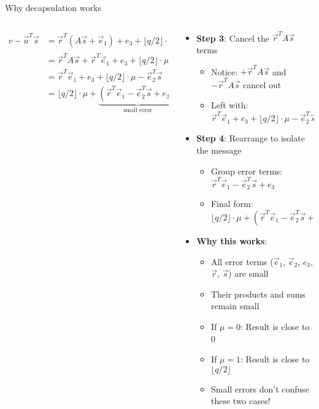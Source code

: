 \documentclass[aspectratio=169, lualatex, handout]{beamer}
\begin{document}
\begin{frame}{Why decapsulation works}
	\begin{columns}[c]
		\begin{column}{0.3\textwidth}
			\tiny
			\begin{align*}
				v - \vec{u}^T\vec{s} & = \vec{r}^{T}(A\vec{s} + \vec{e}_1) + e_3 + \lfloor q/2 \rfloor \cdot \mu - (\vec{r}^{T}A + \vec{e}_{2}^{T})\vec{s}               \\
				                     & = \vec{r}^{T}A\vec{s} + \vec{r}^{T}\vec{e}_1 + e_3 + \lfloor q/2 \rfloor \cdot \mu - \vec{r}^{T}A\vec{s} - \vec{e}_{2}^{T}\vec{s} \\
				                     & = \vec{r}^{T}\vec{e}_{1} + e_3 + \lfloor q/2 \rfloor \cdot \mu - \vec{e}_{2}^{T}\vec{s}                                           \\
				                     & = \lfloor q/2 \rfloor \cdot \mu + \underbrace{(\vec{r}^{T}\vec{e}_{1} - \vec{e}_{2}^{T}\vec{s} + e_3)}_{\text{small error}}
			\end{align*}
		\end{column}
		\begin{column}{0.7\textwidth}
			\begin{itemize}
				\item \textbf{Step 3}: Cancel the $\vec{r}^TA\vec{s}$ terms
				      \begin{itemize}
					      \item Notice: $+\vec{r}^TA\vec{s}$ and $-\vec{r}^TA\vec{s}$ cancel out
					      \item Left with: $\vec{r}^T\vec{e}_1 + e_3 + \lfloor q/2 \rfloor \cdot \mu - \vec{e}_2^T\vec{s}$
				      \end{itemize}
				\item \textbf{Step 4}: Rearrange to isolate the message
				      \begin{itemize}
					      \item Group error terms: $\vec{r}^T\vec{e}_1 - \vec{e}_2^T\vec{s} + e_3$
					      \item Final form: $\lfloor q/2 \rfloor \cdot \mu + (\vec{r}^T\vec{e}_1 - \vec{e}_2^T\vec{s} + e_3)$
				      \end{itemize}
				\item \textbf{Why this works}:
				      \begin{itemize}
					      \item All error terms ($\vec{e}_1$, $\vec{e}_2$, $e_3$, $\vec{r}$, $\vec{s}$) are small
					      \item Their products and sums remain small
					      \item If $\mu = 0$: Result is close to 0
					      \item If $\mu = 1$: Result is close to $\lfloor q/2 \rfloor$
					      \item Small errors don't confuse these two cases!
				      \end{itemize}
			\end{itemize}
		\end{column}
	\end{columns}
\end{frame}
\end{document}
